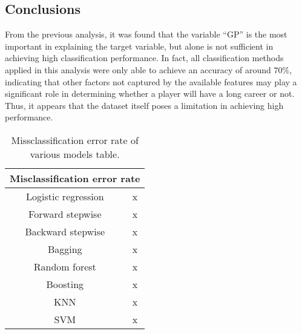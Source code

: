\subsection{Conclusions}

From the previous analysis, it was found that the variable ``GP'' is the most important in explaining the target variable, but alone is not sufficient in achieving high classification performance. In fact, all classification methods applied in this analysis were only able to achieve an accuracy of around $70\%$, indicating that other factors not captured by the available features may play a significant role in determining whether a player will have a long career or not. Thus, it appears that the dataset itself poses a limitation in achieving high performance.

\begin{table}[h]
	\centering
	\begin{tabular}{||c | c ||} 
		\hline
		\multicolumn{2}{|c|}{Misclassification error rate} \\
		\hline
		Logistic regression & x \\
		\hline
		Forward stepwise & x \\
		\hline
		Backward stepwise & x \\
		\hline
		Bagging & x \\
		\hline
		Random forest & x \\
		\hline
		Boosting & x \\
		\hline
		KNN & x \\
		\hline
		SVM & x \\
		\hline
	\end{tabular}
	\caption{Missclassification error rate of various models table.}
	\label{table:ClasEvalParams}
\end{table}